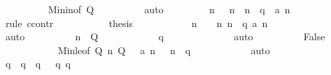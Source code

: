 \begin{isabellebody}
\ \ \ \ \ \ \ \ \isamarkupfalse%
\ Min{\isacharunderscore}in{\isacharbrackleft}of\ {\isacharquery}Q{\isacharbrackright}\isanewline
\ \ \ \ \ \ \ \ \isamarkupfalse%
\ auto\isanewline
\isanewline
\ \ \ \ \ \ \isamarkupfalse%
\ {\isachardoublequoteopen}{\isasymforall}\ n{\isachardot}\ {}\ {\isasymle}\ n\ {\isasymand}\ n\ {\isacharless}\ {\isacharquery}q\ {\isasymlongrightarrow}\ a\ n\ {\isacharequal}\ {}{\isachardoublequoteclose}\isanewline
\ \ \ \ \ \ \isamarkupfalse%
\ {\isacharparenleft}rule\ ccontr{\isacharparenright}\isanewline
\ \ \ \ \ \ \ \ \isamarkupfalse%
\ {\isachardoublequoteopen}{\isasymnot}\ {\isacharquery}thesis{\isachardoublequoteclose}\isanewline
\ \ \ \ \ \ \ \ \isamarkupfalse%
\ \isamarkupfalse%
\ n\ \ {\isachardoublequoteopen}{}\ {\isasymle}\ n{\isachardoublequoteclose}\ {\isachardoublequoteopen}n\ {\isacharless}\ {\isacharquery}q{\isachardoublequoteclose}\ {\isachardoublequoteopen}a\ n\ {\isasymnoteq}\ {}{\isachardoublequoteclose}\isanewline
\ \ \ \ \ \ \ \ \ \ \isamarkupfalse%
\ auto\isanewline
\ \ \ \ \ \ \ \ \isamarkupfalse%
\ {\isachardoublequoteopen}n\ {\isasymin}\ {\isacharquery}Q{\isachardoublequoteclose}\isanewline
\ \ \ \ \ \ \ \ \ \ \isamarkupfalse%
\ {\isacharbackquoteopen}{\isacharquery}q\ {\isasymle}\ {}{}{}{}{\isacharbackquoteclose}\isanewline
\ \ \ \ \ \ \ \ \ \ \isamarkupfalse%
\ auto\isanewline
\ \ \ \ \ \ \ \ \isamarkupfalse%
\ False\isanewline
\ \ \ \ \ \ \ \ \ \ \isamarkupfalse%
\ Min{\isacharunderscore}le{\isacharbrackleft}of\ {\isacharquery}Q\ n{\isacharbrackright}\ {\isacharbackquoteopen}{\isacharquery}Q\ {\isasymnoteq}\ {\isacharbraceleft}{\isacharbraceright}{\isacharbackquoteclose}\ {\isacharbackquoteopen}a\ n\ {\isasymnoteq}\ {}{\isacharbackquoteclose}\ {\isacharbackquoteopen}n\ {\isacharless}\ {\isacharquery}q{\isacharbackquoteclose}\isanewline
\ \ \ \ \ \ \ \ \ \ \isamarkupfalse%
\ auto\isanewline
\ \ \ \ \ \ \isamarkupfalse%
\isanewline
\isanewline
\ \ \ \ \ \ \isamarkupfalse%
\ q\ \ {\isachardoublequoteopen}q\ {\isacharequal}\ {\isacharquery}q{\isachardoublequoteclose}\ {\isachardoublequoteopen}{}\ {\isasymle}\ q{\isachardoublequoteclose}\ {\isachardoublequoteopen}q\ {\isasymle}\ {}{}{}{}{\isachardoublequoteclose}\ \isamarkupfalse%

\end{isabellebody}
